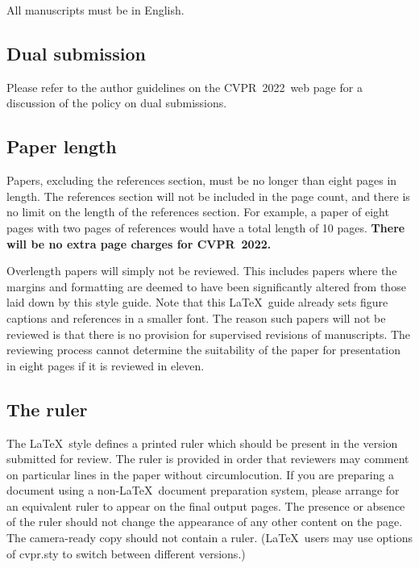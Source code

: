 \documentclass[10pt,twocolumn,letterpaper]{article}
\def\confName{CVPR}
\def\confYear{2022}
\begin{document}
  All manuscripts must be in English.

  \subsection{Dual submission}

  Please refer to the author guidelines on the \confName\ \confYear\ web page for a
  discussion of the policy on dual submissions.

  \subsection{Paper length}
  Papers, excluding the references section, must be no longer than eight pages in length.
  The references section will not be included in the page count, and there is no limit on the length of the references section.
  For example, a paper of eight pages with two pages of references would have a total length of 10 pages.
  {\bf There will be no extra page charges for \confName\ \confYear.}

  Overlength papers will simply not be reviewed.
  This includes papers where the margins and formatting are deemed to have been significantly altered from those laid down by this style guide.
  Note that this \LaTeX\ guide already sets figure captions and references in a smaller font.
  The reason such papers will not be reviewed is that there is no provision for supervised revisions of manuscripts.
  The reviewing process cannot determine the suitability of the paper for presentation in eight pages if it is reviewed in eleven.

  \subsection{The ruler}
  The \LaTeX\ style defines a printed ruler which should be present in the version submitted for review.
  The ruler is provided in order that reviewers may comment on particular lines in the paper without circumlocution.
  If you are preparing a document using a non-\LaTeX\ document preparation system, please arrange for an equivalent ruler to appear on the final output pages.
  The presence or absence of the ruler should not change the appearance of any other content on the page.
  The camera-ready copy should not contain a ruler.
  (\LaTeX\ users may use options of cvpr.sty to switch between different versions.)
\end{document}
